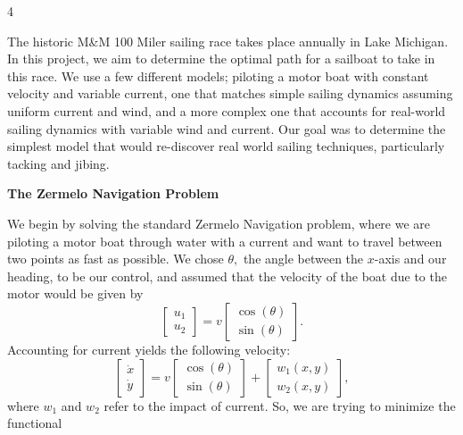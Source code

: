 \documentclass[a0]{a0poster}
\newcommand{\NumColumns}{4}
\begin{document}
\vspace*{-2.5cm}


\color{black}
\noindent
\begin{minipage}{\linewidth}
\begin{multicols*}{\NumColumns}
    
\large 
\vspace{1cm}
The historic M\&M 100 Miler sailing race takes place annually in Lake Michigan. In this project, we aim to determine the optimal path for a sailboat to take in this race. We use a few different models; piloting a motor boat with constant velocity and variable current, one that matches simple sailing dynamics assuming uniform current and wind, and a more complex one that accounts for real-world sailing dynamics with variable wind and current. Our goal was to determine the simplest model that would re-discover real world sailing techniques, particularly tacking and jibing.


\begin{center}
\LARGE{\textbf{The Zermelo Navigation Problem}}
\end{center}
\vspace{1cm}
We begin by solving the standard Zermelo Navigation problem, where we are piloting a motor boat through water with a current and want to travel between two points as fast as possible. We chose $\theta,$ the angle between the $x$-axis and our heading, to be our control, and assumed that the velocity of the boat due to the motor would be given by
\[
\begin{bmatrix} u_1 \\ u_2 \end{bmatrix} = v \begin{bmatrix} \cos(\theta) \\ \sin(\theta) \end{bmatrix}.
\]
Accounting for current yields the following velocity:
\[
\begin{bmatrix} \dot x \\ \dot y \end{bmatrix} = v \begin{bmatrix} \cos(\theta) \\ \sin(\theta) \end{bmatrix} + \begin{bmatrix} w_1(x, y) \\ w_2(x, y) \end{bmatrix},
\]
where $w_1$ and $w_2$ refer to the impact of current. So, we are trying to minimize the functional


\end{multicols*}
\end{minipage}
\end{document}
